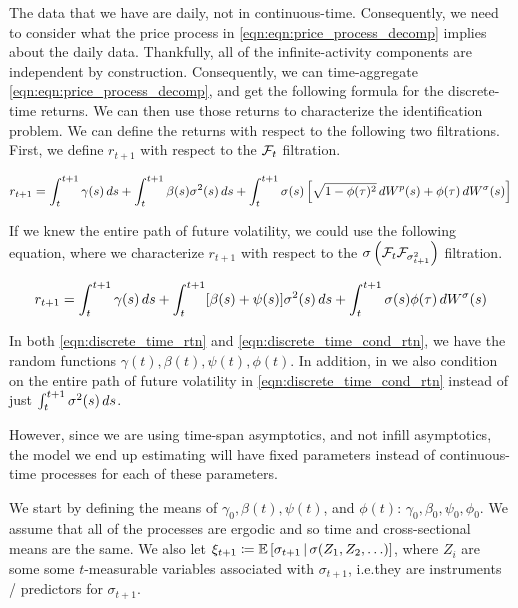 \documentclass[11pt, letterpaper, twoside, final]{article}
\begin{document}
The data that we have are daily, not in continuous-time. 
Consequently, we need to consider what the price process in  \cref{eqn:eqn:price_process_decomp} implies about the
daily data.
Thankfully, all of the infinite-activity components are independent by construction.
Consequently, we can time-aggregate \cref{eqn:eqn:price_process_decomp}, and get the following formula for the
discrete-time returns.  
We can then use those returns to characterize the identification problem.
We can define the returns with respect to the following two filtrations.
First, we define $r_{t+1}$ with respect to the $\mathcal{F}_{t}$ filtration.

\begin{equation}
    \label{eqn:discrete_time_rtn}
    r_{t+1} = \int_t^{t+1} \gamma(s) \mathop{}\!d s + \int_{t}^{t+1} \beta(s) \sigma^2(s) \mathop{}\!d s +
    \int_t^{t+1} \sigma(s) \left[\sqrt{1 - \phi(\tau)^2} \mathop{}\!d W^{p}(s) + \phi(\tau) \mathop{}\!d W^{\sigma}(s)\right]
\end{equation}

If we knew the entire path of future volatility, we could use the following equation, where we characterize
$r_{t+1}$ with respect to the $\sigma\left(\mathcal{F}_{t} \mathcal{F}_{\sigma^2_{t+1}}\right)$ filtration.

\begin{equation}
    \label{eqn:discrete_time_cond_rtn}
    r_{t+1} = \int_t^{t+1} \gamma(s) \mathop{}\!d s + \int_{t}^{t+1} [\beta(s) + \psi(s)] \sigma^2(s) \mathop{}\!d s +
    \int_t^{t+1} \sigma(s) \phi(\tau) \mathop{}\!d W^{\sigma}(s)
\end{equation}

In both \cref{eqn:discrete_time_rtn} and \cref{eqn:discrete_time_cond_rtn}, we have the random functions
$\gamma(t), \beta(t), \psi(t), \phi(t)$.
In addition, in we also condition on the entire path of future volatility in \cref{eqn:discrete_time_cond_rtn}
instead of just $\int_t^{t+1} \sigma^2(s) \mathop{}\!d s$.

However, since we are using time-span  asymptotics, and not infill asymptotics, the model we end up estimating
will have fixed parameters instead of continuous-time processes for each of these parameters.

We start by defining the means of $\gamma_0, \beta(t), \psi(t)$, and $\phi(t)$: $\gamma_0, \beta_0, \psi_0, \phi_0$.
We assume that all of the processes are ergodic and so time and cross-sectional means are the same.
We also let $\xi_{t+1} \coloneqq \operatorname{\mathbb{E}}\left[\sigma_{t+1} \,\middle\vert\, \sigma(Z_1,Z_2, \ldots) \right]$, where $Z_i$ are
some some $t$-measurable variables associated with $\sigma_{t+1}$, i.e.\@ they are instruments / predictors for
$\sigma_{t+1}$.
\end{document}
